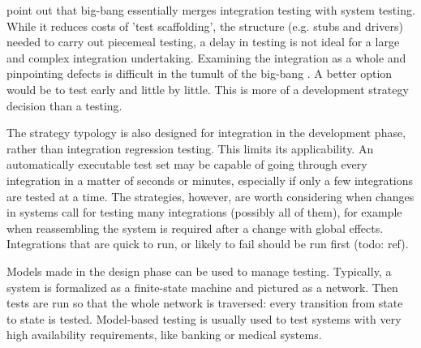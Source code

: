 \documentclass[12pt,a4paper,oneside,pdftex]{report}
\begin{document}
\citet{pezze2008software} point out that big-bang essentially merges integration testing with system testing. While it reduces costs of 'test scaffolding', the structure (e.g. stubs and drivers) needed to carry out piecemeal testing, a delay in testing is not ideal for a large and complex integration undertaking. Examining the integration as a whole and pinpointing defects is difficult in the tumult of the big-bang \citep{myers1976software, pezze2008software}. A better option would be to test early and little by little. This is more of a development strategy decision than a testing.

The strategy typology is also designed for integration in the development phase, rather than integration regression testing. This limits its applicability. An automatically executable test set may be capable of going through every integration in a matter of seconds or minutes, especially if only a few integrations are tested at a time. The strategies, however, are worth considering when changes in systems call for testing many integrations (possibly all of them), for example when reassembling the system is required after a change with global effects. Integrations that are quick to run, or likely to fail should be run first \citep{duvall2008continuous} (todo: ref). 

Models made in the design phase can be used to manage testing. Typically, a system is formalized as a finite-state machine and pictured as a network. Then tests are run so that the whole network is traversed: every transition from state to state is tested. Model-based testing is usually used to test systems with very high availability requirements, like banking or medical systems.


\begin{comment} %
Other incremental testing methods include delivery, criticality, or functionality based 
strategies \citep{van2008identifying} where the system connections and hierarchy are built selectively an integration at a time. Further, \citet{carey1977control} discuss build testing. \citet{beizer1984software} introduces a "mixed bag" strategy which combines bottom-up, top-down, big-bang and build testing. 
\end{comment}
\end{document}
